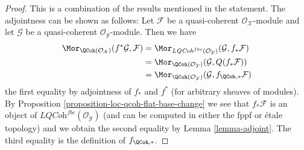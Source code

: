 \begin{proof}
This is a combination of the results mentioned in the statement.
The adjointness can be shown as follows: Let $\mathcal{F}$
be a quasi-coherent $\mathcal{O}_\mathcal{X}$-module and let
$\mathcal{G}$ be a quasi-coherent $\mathcal{O}_\mathcal{Y}$-module.
Then we have
\begin{align*}
\Mor_{\QCoh(\mathcal{O}_\mathcal{X})}(f^*\mathcal{G}, \mathcal{F})
& =
\Mor_{\textit{LQCoh}^{fbc}(\mathcal{O}_\mathcal{Y})}
(\mathcal{G}, f_*\mathcal{F}) \\
& =
\Mor_{\QCoh(\mathcal{O}_\mathcal{Y})}(\mathcal{G}, Q(f_*\mathcal{F}))
\\
& =
\Mor_{\QCoh(\mathcal{O}_\mathcal{Y})}(\mathcal{G},
f_{\QCoh, *}\mathcal{F})
\end{align*}
the first equality by adjointness of $f_*$ and $f^*$ (for arbitrary sheaves
of modules). By
Proposition \ref{proposition-loc-qcoh-flat-base-change}
we see that $f_*\mathcal{F}$ is an object of
$\textit{LQCoh}^{fbc}(\mathcal{O}_\mathcal{Y})$
(and can be computed in either the fppf or \'etale topology) and we
obtain the second equality by Lemma \ref{lemma-adjoint}. The third
equality is the definition of $f_{\QCoh, *}$.


\end{proof}
